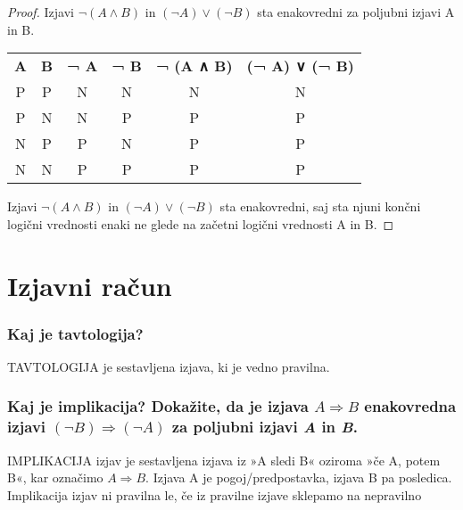 \documentclass{article}
\begin{document}
\begin{proof}
Izjavi $\neg (A \land B)$ in $(\neg A) \lor (\neg B)$ sta enakovredni za poljubni izjavi A in B. \\
\begin{table}[h!]
\begin{tabular}{cccccc}
{ \textbf{A}} & { \textbf{B}} & { \textbf{¬ A}} & { \textbf{¬ B}} & { \textbf{¬ (A ∧ B)}}        & { \textbf{(¬ A) ∨ (¬ B)}}    \\
{ P}          & { P}          & { N}            & { N}            & N & N \\
{ P}          & { N}          & { N}            & { P}            & P & P \\
{ N}          & { P}          & { P}            & { N}            & P & P \\
{ N}          & { N}          & { P}            & { P}            & P & P
\end{tabular}
\end{table}
Izjavi $\neg (A \land B)$ in $(\neg A) \lor (\neg B)$ sta enakovredni, saj sta njuni končni logični vrednosti enaki ne glede na začetni logični vrednosti A in B.

\end{proof}

\section{Izjavni račun}

\subsubsection*{Kaj je tavtologija? }
TAVTOLOGIJA je sestavljena izjava, ki je vedno pravilna.

\subsubsection*{Kaj je implikacija? Dokažite, da je izjava $A \Rightarrow B$ enakovredna izjavi $(\neg B) \Rightarrow (\neg A)$ za poljubni izjavi \emph{A} in \emph{B}.}

IMPLIKACIJA izjav je sestavljena izjava iz »A sledi B« oziroma »če A, potem B«, kar označimo $A \Rightarrow B$. Izjava A je pogoj/predpostavka, izjava B pa posledica. Implikacija izjav ni pravilna le, če iz pravilne izjave sklepamo na nepravilno
\end{document}
